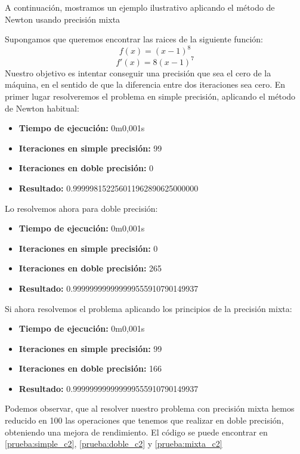 A continuación, mostramos un ejemplo ilustrativo aplicando el método de Newton usando precisión mixta
\begin{ejemplo}
  Supongamos que queremos encontrar las raices de la siguiente función:
  \[
  f(x) = (x-1)^8
  \]
  \[
  f'(x) = 8 (x-1)^7
  \]
  Nuestro objetivo es intentar conseguir una precisión que sea el cero de la máquina, en el sentido de que la diferencia entre dos iteraciones sea cero. En primer lugar resolveremos el problema en simple precisión, aplicando el método de Newton habitual:
  \begin{itemize}
  \item \textbf{Tiempo de ejecución: } 0m0,001s
  \item \textbf{Iteraciones en simple precisión: } 99
  \item \textbf{Iteraciones en doble precisión: } 0
  \item \textbf{Resultado: } 0.999998152256011962890625000000
  \end{itemize}

  Lo resolvemos ahora para doble precisión:
  \begin{itemize}
  \item \textbf{Tiempo de ejecución: } 0m0,001s
  \item \textbf{Iteraciones en simple precisión: } 0
  \item \textbf{Iteraciones en doble precisión: } 265
  \item \textbf{Resultado: } 0.999999999999999555910790149937
  \end{itemize}

  Si ahora resolvemos el problema aplicando los principios de la precisión mixta:
  \begin{itemize}
  \item \textbf{Tiempo de ejecución: } 0m0,001s
  \item \textbf{Iteraciones en simple precisión: } 99
  \item \textbf{Iteraciones en doble precisión: } 166
  \item \textbf{Resultado: } 0.999999999999999555910790149937
  \end{itemize}

  Podemos observar, que al resolver nuestro problema con precisión mixta hemos reducido en 100 las operaciones que tenemos que realizar en doble precisión, obteniendo una mejora de rendimiento. El código se puede encontrar en \ref{prueba:simple_c2}, \ref{prueba:doble_c2} y \ref{prueba:mixta_c2}
\end{ejemplo}

